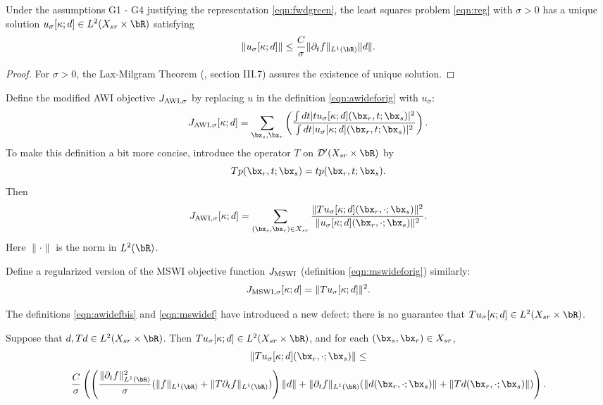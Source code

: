 \begin{prop}
  \label{thm:unorm}
  Under the assumptions G1 - G4 justifying the
  representation \ref{eqn:fwdgreen}, the least squares problem
  \ref{eqn:reg} with $\sigma > 0$ has a unique solution
  $u_{\sigma}[\kappa;d] \in L^2(X_{sr} \times \bR)$ satisfying
  \begin{equation}
    \label{eqn:unorm}
    \|u_{\sigma}[\kappa;d]\| \le \frac{C}{\sigma}\|\partial_t f\|_{L^1(\bR)}\|d\|.
  \end{equation}
\end{prop}
\begin{proof}
For $\sigma > 0$, the Lax-Milgram Theorem (\cite{Yosida}, section
III.7) assures the existence of unique solution. 
\end{proof}

Define the modified
AWI objective $J_{\rm AWI,\sigma}$ by
replacing $u$ in the definition \ref{eqn:awideforig} with $u_{\sigma}$:
\begin{equation}
  \label{eqn:awidef}
  J_{\rm AWI,\sigma}[\kappa;d] = \sum_{\bx_s,\bx_r} \left(\frac{\int dt |tu_{\sigma}[\kappa;d](\bx_r,t;\bx_s)|^2}{\int dt |u_{\sigma}[\kappa;d](\bx_r,t;\bx_s)|^2}\right). 
\end{equation}
To make this definition a bit more concise, introduce the operator $T$ on
${\cal D}'(X_{sr} \times \bR)$ by
\[
  Tp(\bx_r,t;\bx_s) = tp(\bx_r,t;\bx_s).
\]
Then
\begin{equation}
  \label{eqn:awidefbis}
  J_{\rm AWI,\sigma}[\kappa;d] = \sum_{(\bx_s,\bx_r) \in X_{sr}}
  \frac{\|Tu_{\sigma}[\kappa;d](\bx_r,\cdot;\bx_s)\|^2}{\|u_{\sigma}[\kappa;d](\bx_r,\cdot;\bx_s)\|^2}.
\end{equation}
Here $\| \cdot \|$ is the norm in $L^2(\bR)$.

Define a regularized version of the MSWI objective function $J_{\rm
  MSWI}$ (definition \ref{eqn:mswideforig}) similarly:
\begin{equation}
  \label{eqn:mswidef}
  J_{\rm MSWI,\sigma}[\kappa;d] = \|Tu_{\sigma}[\kappa;d]\|^2.
\end{equation}

The definitions \ref{eqn:awidefbis} and \ref{eqn:mswidef} have introduced a new defect: there is no
guarantee that $Tu_{\sigma}[\kappa;d] \in L^2(X_{sr} \times\bR)$.

\begin{prop}
  \label{thm:tl2}
  Suppose that $d, Td \in L^2(X_{sr} \times \bR)$. Then
  $Tu_{\sigma}[\kappa;d]  \in L^2(X_{sr} \times \bR)$, and for each
  $(\bx_s,\bx_r) \in X_{sr}$,
  \[
    \|Tu_{\sigma}[\kappa;d](\bx_r,\cdot;\bx_s)\| \le
  \]
  \begin{equation}
    \label{eqn:tunorm}
    \frac{C}{\sigma}\left(\left(
        \frac{\|\partial_t f\|^2_{L^1(\bR)}}{\sigma}(\|f\|_{L^1(\bR)}+\|T\partial_tf\|_{L^1(\bR)})
      \right)\|d\| \\ 
    + \|\partial_t  f\|_{L^1(\bR)}(\|d (\bx_r,\cdot;\bx_s)\| +\|Td (\bx_r,\cdot;\bx_s)\|)\right).
  \end{equation}
\end{prop}

